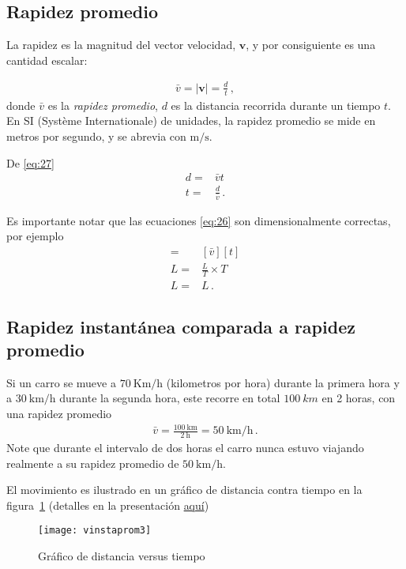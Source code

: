 \subsection{Rapidez promedio}
La rapidez es la magnitud del vector velocidad, $\mathbf{v}$,  y por consiguiente es una cantidad escalar:

\begin{align}
  \label{eq:27}
\bar{v}=|\mathbf{v}|=\frac{d}{t}\,,
\end{align}
donde $\bar{v}$ es la \emph{rapidez promedio}, $d$ es la distancia
recorrida durante un tiempo $t$. En SI (Système Internationale) de
unidades, la rapidez promedio se mide en metros por segundo, y se
abrevia con $\si{\meter\per\second}$.

De \eqref{eq:27}
\begin{align}
  \label{eq:26}
  d=&\bar{v} t\nonumber\\
  t=&\frac{d}{\bar{v}}\,.
\end{align}

Es importante notar que las ecuaciones \eqref{eq:26} son dimensionalmente correctas, por ejemplo
\begin{align}
  [d]=&  \left[\bar{v}   \right] [t]\nonumber\\
  L=&\frac{L}{T}\times T\nonumber\\
  L=&L\,.
\end{align}

\subsection{Rapidez instantánea comparada a rapidez promedio}

Si un carro se mueve a $70\ \text{Km/h}$ (kilometros por hora) durante la primera hora y a $\SI{30}{\kilo\meter\per\hour}$
durante la segunda hora, este recorre en total $\SI{100}{km}$ en 2 horas, con una rapidez promedio
\begin{align}
  \bar{v}=\frac{\SI{100}{\kilo\meter}}{\SI{2}{\hour}}=\SI{50}{\kilo\meter\per\hour}\,.
\end{align}
Note que durante el intervalo de dos horas el carro nunca estuvo viajando realmente a su rapidez promedio de $\SI{50}{\kilo\meter\per\hour}$.

El movimiento es ilustrado en un gráfico de distancia contra tiempo en la figura~\ref{fig:vinstaprom3} (detalles en la presentación \href{http://goo.gl/3eqUa}{aquí})

\begin{frame}[plain]
\begin{figure}
  \centering
  \texttt{[image: vinstaprom3]}
  \caption{Gráfico de distancia versus tiempo}
  \label{fig:vinstaprom3}
\end{figure}
\end{frame}


